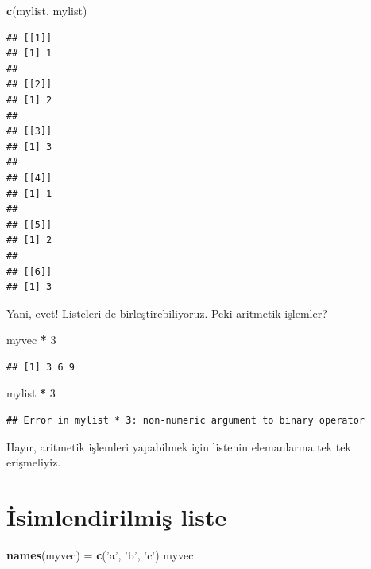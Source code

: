 \documentclass[]{book}
\newenvironment{Shaded}{\begin{snugshade}}{\end{snugshade}}
\newcommand{\DecValTok}[1]{\textcolor[rgb]{0.00,0.00,0.81}{#1}}
\newcommand{\KeywordTok}[1]{\textcolor[rgb]{0.13,0.29,0.53}{\textbf{#1}}}
\newcommand{\NormalTok}[1]{#1}
\newcommand{\OperatorTok}[1]{\textcolor[rgb]{0.81,0.36,0.00}{\textbf{#1}}}
\newcommand{\StringTok}[1]{\textcolor[rgb]{0.31,0.60,0.02}{#1}}
\begin{document}
\begin{Shaded}
\begin{Highlighting}[]
\KeywordTok{c}\NormalTok{(mylist, mylist)}
\end{Highlighting}
\end{Shaded}

\begin{verbatim}
## [[1]]
## [1] 1
## 
## [[2]]
## [1] 2
## 
## [[3]]
## [1] 3
## 
## [[4]]
## [1] 1
## 
## [[5]]
## [1] 2
## 
## [[6]]
## [1] 3
\end{verbatim}

Yani, evet! Listeleri de birleştirebiliyoruz. Peki aritmetik işlemler?

\begin{Shaded}
\begin{Highlighting}[]
\NormalTok{myvec }\OperatorTok{*}\StringTok{ }\DecValTok{3}
\end{Highlighting}
\end{Shaded}

\begin{verbatim}
## [1] 3 6 9
\end{verbatim}

\begin{Shaded}
\begin{Highlighting}[]
\NormalTok{mylist }\OperatorTok{*}\StringTok{ }\DecValTok{3}
\end{Highlighting}
\end{Shaded}

\begin{verbatim}
## Error in mylist * 3: non-numeric argument to binary operator
\end{verbatim}

Hayır, aritmetik işlemleri yapabilmek için listenin elemanlarına tek tek
erişmeliyiz.

\hypertarget{isimlendirilmis-liste}{%
\section{İsimlendirilmiş liste}\label{isimlendirilmis-liste}}

\begin{Shaded}
\begin{Highlighting}[]
\KeywordTok{names}\NormalTok{(myvec) =}\StringTok{ }\KeywordTok{c}\NormalTok{(}\StringTok{'a'}\NormalTok{, }\StringTok{'b'}\NormalTok{, }\StringTok{'c'}\NormalTok{)}
\NormalTok{myvec}
\end{Highlighting}
\end{Shaded}
\end{document}
